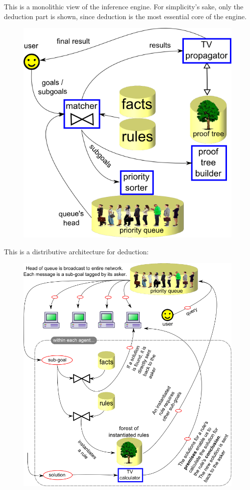 This is a monolithic view of the inference engine.  For simplicity's sake, only the deduction part is shown, since deduction is the most essential core of the engine.

\begin{figure}[H]
\centering
\includegraphics[scale=0.5]{breakdown-IE-1.png}
\end{figure}

This is a distributive architecture for deduction:

\begin{figure}[H]
\centering
\includegraphics[scale=0.6]{breakdown-IE-2.png}
\end{figure}

